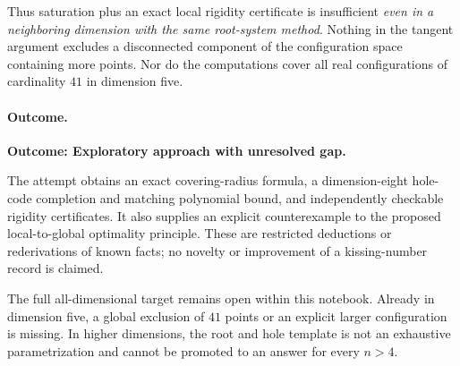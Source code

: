 \documentclass[11pt,a4paper]{article}
\numberwithin{equation}{section}
\begin{document}
Thus saturation plus an exact local rigidity certificate is insufficient
\emph{even in a neighboring dimension with the same root-system method}.
Nothing in the tangent argument excludes a disconnected component of the
configuration space containing more points. Nor do the computations
cover all real configurations of cardinality $41$ in dimension five.

\paragraph{Outcome.}
\textbf{Outcome: Exploratory approach with unresolved gap.}

The attempt obtains an exact covering-radius formula, a dimension-eight
hole-code completion and matching polynomial bound, and independently
checkable rigidity certificates. It also supplies an explicit
counterexample to the proposed local-to-global optimality principle.
These are restricted deductions or rederivations of known facts; no
novelty or improvement of a kissing-number record is claimed.

The full all-dimensional target remains open within this notebook.
Already in dimension five, a global exclusion of $41$ points or an
explicit larger configuration is missing. In higher dimensions, the root
and hole template is not an exhaustive parametrization and cannot be
promoted to an answer for every $n>4$.
\end{document}
